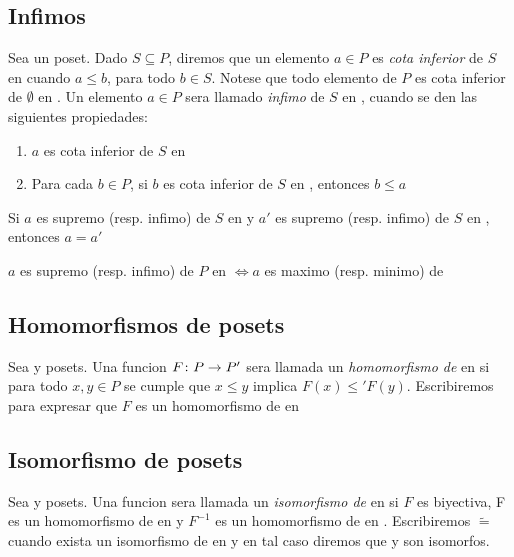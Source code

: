 \subsection{Infimos}
Sea \poset un poset. Dado $S \subseteq P$, diremos que un elemento $a \in P$ es \emph{cota inferior} de $S$
en \poset cuando $a \leq b$, para todo $b \in S$. Notese que todo elemento de $P$ es cota inferior de $\emptyset$
en \poset. Un elemento $a \in P$ sera llamado \emph{infimo} de $S$ en \poset, cuando se den las siguientes propiedades:
\begin{enumerate}
  \item $a$ es cota inferior de $S$ en \poset
  \item Para cada $b \in P$, si $b$ es cota inferior de $S$ en \poset, entonces $b \leq a$
\end{enumerate}
\begin{remark}
  Si $a$ es supremo (resp. infimo) de $S$ en \poset y $a'$ es supremo (resp. infimo) de $S$ en \poset, entonces $a = a'$
\end{remark}
\begin{remark}
  $a$ es supremo (resp. infimo) de $P$ en \poset $\iff a$ es maximo (resp. minimo) de \poset
\end{remark}

\subsection{Homomorfismos de posets}
\begin{definition}
Sea \poset y  posets. Una funcion $F\colon P\rightarrow P'$ sera llamada un \emph{homomorfismo de } \poset
en  si para todo $x, y \in P$ se cumple que $x \leq y$ implica $F(x) \leq' F(y)$.
Escribiremos  para expresar que $F$ es un homomorfismo
de \poset en 
\end{definition}

\subsection{Isomorfismo de posets}
\begin{definition}
  Sea \poset y  posets. Una funcion  sera llamada un \emph{isomorfismo de}
  \poset en  si $F$ es biyectiva, F es un homomorfismo de \poset en 
  y $F^{-1}$ es un homomorfismo de  en \poset. Escribiremos \poset $\tilde{=}$ 
  cuando exista un isomorfismo de \poset en  y en tal caso diremos que \poset y 
  son isomorfos.
\end{definition}

